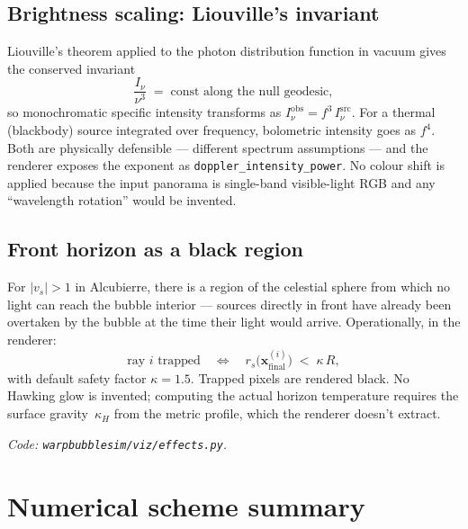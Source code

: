 \documentclass[11pt]{article}
\begin{document}
\subsection{Brightness scaling: Liouville's invariant}

Liouville's theorem applied to the photon distribution function in vacuum
gives the conserved invariant
\begin{equation}
\frac{I_\nu}{\nu^3} \;=\; \text{const along the null geodesic},
\end{equation}
so monochromatic specific intensity transforms as $I_\nu^{\text{obs}} = f^3\,I_\nu^{\text{src}}$.
For a thermal (blackbody) source integrated over frequency, bolometric
intensity goes as $f^4$.  Both are physically defensible — different
spectrum assumptions — and the renderer exposes the exponent as
\texttt{doppler\_intensity\_power}.  No colour shift is applied because
the input panorama is single-band visible-light RGB and any
``wavelength rotation'' would be invented.

\subsection{Front horizon as a black region}

For $|v_s|>1$ in Alcubierre, there is a region of the celestial sphere
from which no light can reach the bubble interior — sources directly in
front have already been overtaken by the bubble at the time their light
would arrive.  Operationally, in the renderer:
\begin{equation}
\text{ray $i$ trapped} \quad\Longleftrightarrow\quad r_s\bigl(\bm x^{(i)}_{\text{final}}\bigr) \;<\; \kappa\,R,
\end{equation}
with default safety factor $\kappa=1.5$.  Trapped pixels are rendered
black.  No Hawking glow is invented; computing the actual horizon
temperature requires the surface gravity~$\kappa_H$ from the metric
profile, which the renderer doesn't extract.

\smallskip
\noindent\emph{Code: \texttt{warpbubblesim/viz/effects.py}.}

\section{Numerical scheme summary}
\end{document}
